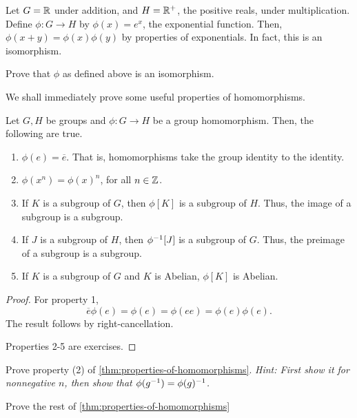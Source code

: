 \documentclass[./main.tex]{subfiles}
\begin{document}
\begin{example}[Exponential]
    Let $G = \mathbb{R}$ under addition, and $H = \mathbb{R}^+$, the positive reals, under
    multiplication. Define $\phi: G \to H$ by $\phi(x) = e^x$, the exponential
    function. Then, $\phi(x+y) = \phi(x) \phi(y)$ by properties of exponentials.
    In fact, this is an isomorphism.
\end{example}
\begin{exercise}
    Prove that $\phi$ as defined above is an isomorphism.
\end{exercise}

We shall immediately prove some useful properties of homomorphisms.
\begin{theorem}
\label{thm:properties-of-homomorphisms}
    Let $G, H$ be groups and $\phi: G \to H$ be a group homomorphism.
    Then, the following are true.
    \begin{enumerate}
        \item $\phi(e) = \overline e$. That is, homomorphisms take the group
        identity to the identity.
        \item $\phi(x^n) = \phi(x)^n$, for all $n \in \mathbb{Z}$.
        \item If $K$ is a subgroup of $G$, then $\phi[K]$ is a subgroup of $H$. Thus, the image of a subgroup is a subgroup.
        \item If $J$ is a subgroup of $H$, then $\phi\inv\paren*{J}$ is a
        subgroup of $G$. Thus, the preimage of a subgroup is a subgroup.
        \item If $K$ is a subgroup of $G$ and $K$ is Abelian, $\phi[K]$ is Abelian.
    \end{enumerate}
\end{theorem}
\begin{proof}
    For property 1, 
    \[
        \overline e \phi(e) = \phi(e) = \phi(ee) = \phi(e)\phi(e). 
    \]
    The result follows by right-cancellation.

    Properties 2-5 are exercises.
\end{proof}

\begin{exercise}
    Prove property (2) of \cref{thm:properties-of-homomorphisms}. \textit{Hint:
    First show it for nonnegative $n$, then show that $\phi(g^{-1}) =
    \phi(g)^{-1}$.}
\end{exercise}

\begin{exercise}
    Prove the rest of \cref{thm:properties-of-homomorphisms}
\end{exercise}
\end{document}
